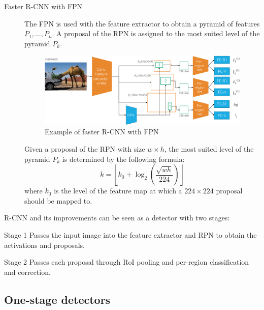 \begin{description}
    \item[Faster R-CNN with FPN] 
        The FPN is used with the feature extractor to obtain a pyramid of features $P_1, \dots, P_n$. A proposal of the RPN is assigned to the most suited level of the pyramid $P_k$.

        \begin{figure}[H]
            \centering
            \includegraphics[width=0.8\linewidth]{./img/_faster_r_cnn_fpn.pdf}
            \caption{Example of faster R-CNN with FPN}
        \end{figure}

        \begin{remark}
            Given a proposal of the RPN with size $w \times h$, the most suited level of the pyramid $P_k$ is determined by the following formula:
            \[ k = \left\lfloor k_0 + \log_2\left(\frac{\sqrt{wh}}{224}\right) \right\rfloor \]
            where $k_0$ is the level of the feature map at which a $224 \times 224$ proposal should be mapped to.
        \end{remark}
\end{description}

\begin{remark}
    R-CNN and its improvements can be seen as a detector with two stages:
    \begin{descriptionlist}
        \item[Stage 1] 
            Passes the input image into the feature extractor and RPN to obtain the activations and proposals.
        \item[Stage 2] 
            Passes each proposal through RoI pooling and per-region classification and correction.
    \end{descriptionlist}
\end{remark}


\subsection{One-stage detectors}

